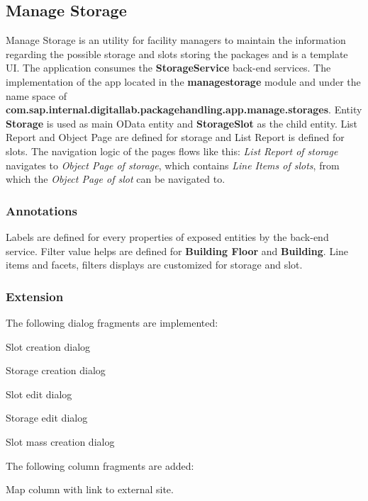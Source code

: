 \subsection{Manage Storage}

Manage Storage is an utility for facility managers to maintain the information regarding the possible storage and slots storing the packages and is a template UI.
The application consumes the \textbf{StorageService} back-end services.
The implementation of the app
located in the \textbf{managestorage} module and under the name space of
\textbf{com.sap.internal.digitallab.packagehandling.app.manage.storages}.
Entity \textbf{Storage} is used as main OData entity and \textbf{StorageSlot} as the child entity.
List Report and Object Page are defined for storage and List Report is defined for slots. The navigation logic of the pages flows like this: \textit{List Report of storage} navigates to \textit{Object Page of storage}, which contains \textit{Line Items of 
slots}, from which the \textit{Object Page of slot} can be navigated to.

\subsubsection{Annotations}
Labels are defined for every properties of exposed entities by the back-end service. Filter value helps are defined for \textbf{Building Floor} and \textbf{Building}.
Line items and facets, filters displays are customized for storage and slot.

\subsubsection{Extension}

The following dialog fragments are implemented:
\begin{compactenum}
    \item Slot creation dialog
    \item Storage creation dialog
    \item Slot edit dialog
    \item Storage edit dialog
    \item Slot mass creation dialog
\end{compactenum}

\bigskip
The following column fragments are added:
\begin{compactenum}
    \item Map column with link to external site.
\end{compactenum}

